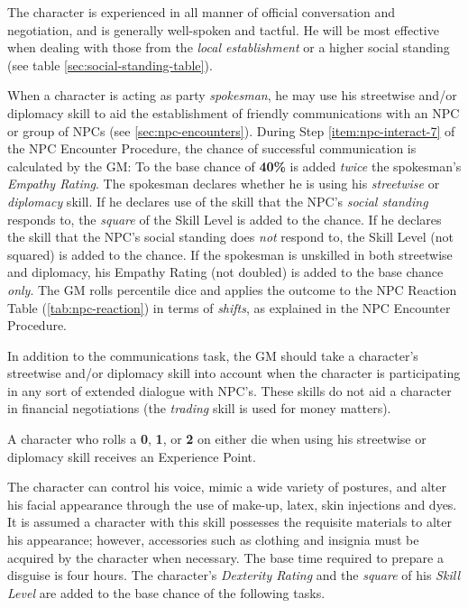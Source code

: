 \label{sec:skill-diplomacy}

The character is experienced in all manner of official conversation
and negotiation, and is generally well-spoken and tactful.  He will be
most effective when dealing with those from the \emph{local establishment} or
a higher social standing (see table \ref{sec:social-standing-table}).

When a character is acting as party \emph{spokesman}, he may use his
streetwise and/or diplomacy skill to aid the establishment of friendly
communications with an NPC or group of NPCs (see
\ref{sec:npc-encounters}).  During Step \ref{item:npc-interact-7}
of the NPC Encounter
Procedure, the chance of successful communication is calculated by the
GM: To the base chance of \textbf{40\%} is added \emph{twice} the spokesman's
\emph{Empathy Rating}.  The spokesman declares whether he is using
his \emph{streetwise} or \emph{diplomacy} skill.  If he declares use
of the skill that the NPC's \emph{social standing} responds to, the
\emph{square} of the Skill Level is added to the chance.  If he declares the
skill that the NPC's social standing does \emph{not} respond to, the
Skill Level (not squared) is added to the chance.  If the spokesman is
unskilled in both streetwise and diplomacy, his Empathy Rating (not
doubled) is added to the base chance \emph{only}.  The GM rolls
percentile dice and applies the outcome to the NPC Reaction Table
(\ref{tab:npc-reaction}) in terms of \emph{shifts}, as explained in
the NPC Encounter Procedure.

In addition to the communications task, the GM should take a
character's streetwise and/or diplomacy skill into account when the
character is participating in any sort of extended dialogue with
NPC's.  These skills do not aid a character in financial negotiations
(the \emph{trading} skill is used for money matters).

A character who rolls a \textbf{0}, \textbf{1}, or \textbf{2} on
either die when using his streetwise or diplomacy skill receives an
Experience Point.

\label{sec:skill-disguise}

The character can control his voice, mimic a wide variety of postures,
and alter his facial appearance through the use of make-up, latex,
skin injections and dyes.  It is assumed a character with this skill
possesses the requisite materials to alter his appearance; however,
accessories such as clothing and insignia must be acquired by the
character when necessary.  The base time required to prepare a disguise
is four hours.  The character's \emph{Dexterity Rating} and the
\emph{square} of his \emph{Skill Level} are added to the base chance
of the following tasks.

